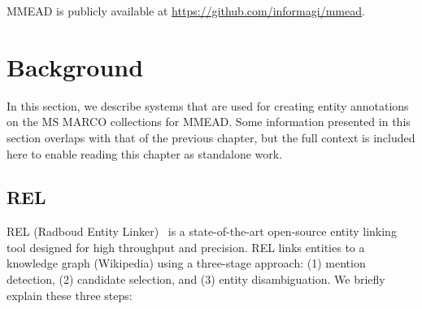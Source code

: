 MMEAD is publicly available at \url{https://github.com/informagi/mmead}.

\section{Background}
In this section, we describe systems that are used for creating entity annotations on the MS MARCO collections for MMEAD. Some information presented in this section overlaps with that of the previous chapter, but the full context is included here to enable reading this chapter as standalone work.

\subsection{REL}
REL (Radboud Entity Linker)~\citep{rel} is a state-of-the-art open-source entity linking tool designed for high throughput and precision. REL links entities to a knowledge graph (Wikipedia) using a three-stage approach: (1) mention detection, (2) candidate selection, and (3) entity disambiguation. We briefly explain these three steps:

